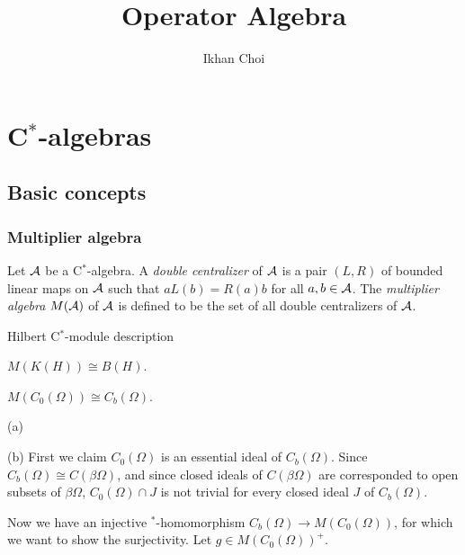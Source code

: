 \documentclass{../note}
\begin{document}
\title{Operator Algebra}
\author{Ikhan Choi}
\maketitle
\tableofcontents

\part{C$^*$-algebras}
\chapter{Basic concepts}

\section{Multiplier algebra}

\begin{prb}
Let $\mathcal{A}$ be a C$^*$-algebra.
A \emph{double centralizer} of $\mathcal{A}$ is a pair $(L,R)$ of bounded linear maps on $\mathcal{A}$ such that $aL(b)=R(a)b$ for all $a,b\in\mathcal{A}$.
The \emph{multiplier algebra} $M(\mathcal{A})$ of $\mathcal{A}$ is defined to be the set of all double centralizers of $\mathcal{A}$.
\end{prb}

\begin{prb}
\begin{parts}
\item Hilbert C$^*$-module description
\end{parts}
\end{prb}

\begin{prb}
\begin{parts}
\item $M(K(H))\cong B(H)$.
\item $M(C_0(\Omega))\cong C_b(\Omega)$.
\end{parts}
\end{prb}
\begin{pf}
(a)

(b)
First we claim $C_0(\Omega)$ is an essential ideal of $C_b(\Omega)$.
Since $C_b(\Omega)\cong C(\beta\Omega)$, and since closed ideals of $C(\beta\Omega)$ are corresponded to open subsets of $\beta\Omega$, $C_0(\Omega)\cap J$ is not trivial for every closed ideal $J$ of $C_b(\Omega)$.

Now we have an injective $^*$-homomorphism $C_b(\Omega)\to M(C_0(\Omega))$, for which we want to show the surjectivity.
Let $g\in M(C_0(\Omega))^+$.
\end{pf}
\end{document}
